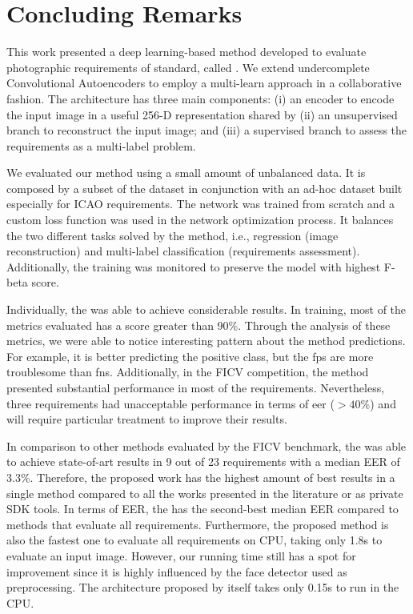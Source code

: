 \section{Concluding Remarks}

This work presented a deep learning-based method developed to evaluate photographic requirements of \icao standard, called \methodname. We extend undercomplete Convolutional Autoencoders to employ a multi-learn approach in a collaborative fashion. The architecture has three main components: (i) an encoder to encode the input image in a useful 256-D representation shared by (ii) an unsupervised branch to reconstruct the input image; and (iii) a supervised branch to assess the requirements as a multi-label problem. 

We evaluated our method using a small amount of unbalanced data. It is composed by a subset of the \ficvtest dataset in conjunction with an ad-hoc dataset built especially for ICAO requirements. The network was trained from scratch and a custom loss function was used in the network optimization process. It balances the two different tasks solved by the method, i.e., regression (image reconstruction) and multi-label classification (requirements assessment). Additionally, the training was monitored to preserve the model with highest F-beta score.

Individually, the \methodname was able to achieve considerable results. In training, most of the metrics evaluated has a score greater than 90\%. Through the analysis of these metrics, we were able to notice interesting pattern about the method predictions. For example, it is better predicting the positive class, but the \aclp{fp} are more troublesome than \aclp{fn}. Additionally, in the FICV competition, the method presented substantial performance in most of the requirements. Nevertheless, three requirements had unacceptable performance in terms of \acs{eer} ($> 40\%$) and will require particular treatment to improve their results.

In comparison to other methods evaluated by the FICV benchmark, the \methodname was able to achieve state-of-art results in 9 out of 23 requirements with a median EER of 3.3\%. Therefore, the proposed work has the highest amount of best results in a single method compared to all the works presented in the literature or as private SDK tools. In terms of EER, the \methodname has the second-best median EER compared to methods that evaluate all requirements. Furthermore, the proposed method is also the fastest one to evaluate all requirements on CPU, taking only 1.8s to evaluate an input image. However, our running time still has a spot for improvement since it is highly influenced by the face detector used as preprocessing. The architecture proposed by itself takes only 0.15s to run in the CPU.

